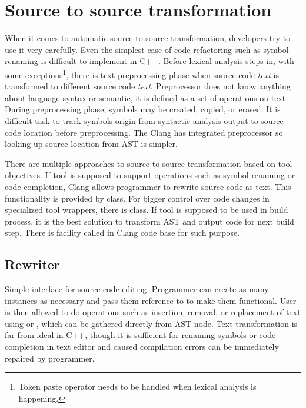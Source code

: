 \section{Source to source transformation}
When it comes to automatic source-to-source transformation, developers try to use it very carefully. Even the simplest case of code refactoring such as symbol renaming is difficult to implement in C++. Before lexical analysis steps in, with some exceptions\footnote{Token paste operator \code{\#\#} needs to be handled when lexical analysis is happening.}, there is text-preprocessing phase when source code \emph{text} is transformed to different source code \emph{text}. Preprocessor does not know anything about language syntax or semantic, it is defined as a set of operations on text. During preprocessing phase, symbols may be created, copied, or erased. It is difficult task to track symbols origin from syntactic analysis output to source code location before preprocessing. The Clang has integrated preprocessor so looking up source location from AST is simpler.

There are multiple approaches to source-to-source transformation based on tool objectives. If tool is supposed to support operations such as symbol renaming or code completion, Clang allows programmer to rewrite source code as text. This functionality is provided by  class. For bigger control over code changes in specialized tool wrappers, there is  class. If tool is supposed to be used in build process, it is the best solution to transform AST and output code for next build step. There is facility called  in Clang code base for such purpose.

\subsection{Rewriter}
Simple interface for source code editing. Programmer can create as many instances as necessary and pass them reference to  to make them functional.  User is then allowed to do operations such as insertion, removal, or replacement of text using  or , which can be gathered directly from AST node. Text transformation is far from ideal in C++, though it is sufficient for renaming symbols or code completion in text editor and caused compilation errors can be immediately repaired by programmer.

